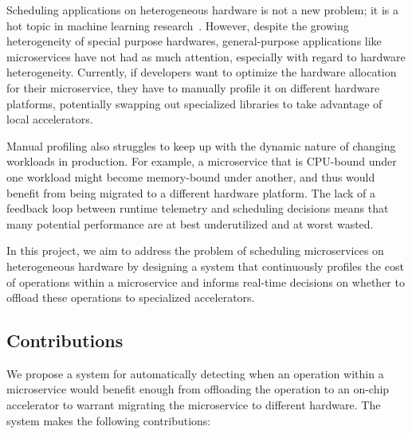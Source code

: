 Scheduling applications on heterogeneous hardware is not a new problem; it is a hot topic in machine learning research~\cite{narayanan2023hetero,subramanya2023sia}.
However, despite the growing heterogeneity of special purpose hardwares, general-purpose applications like microservices have not had as much attention, especially with regard to hardware heterogeneity.
Currently, if developers want to optimize the hardware allocation for their microservice, they have to manually profile it on different hardware platforms, potentially swapping out specialized libraries to take advantage of local accelerators.

Manual profiling also struggles to keep up with the dynamic nature of changing workloads in production.
For example, a microservice that is CPU-bound under one workload might become memory-bound under another, and thus would benefit from being migrated to a different hardware platform.
The lack of a feedback loop between runtime telemetry and scheduling decisions means that many potential performance are at best underutilized and at worst wasted.

In this project, we aim to address the problem of scheduling microservices on heterogeneous hardware by designing a system that continuously profiles the cost of operations within a microservice and informs real-time decisions on whether to offload these operations to specialized accelerators.

\subsection{Contributions}

We propose a system for automatically detecting when an operation within a microservice would benefit enough from offloading the operation to an on-chip accelerator to warrant migrating the microservice to different hardware.
The system makes the following contributions:

